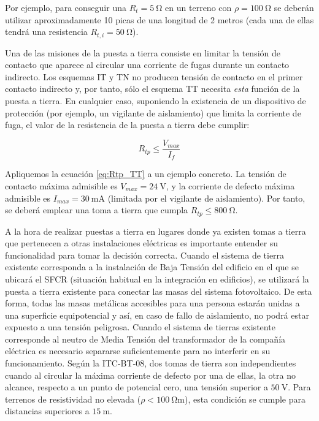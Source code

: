 Por ejemplo, para conseguir una $R_{t}=\SI{5}{\ohm}$ en un terreno
con $\rho=\SI{100}{\ohm}$ se deberán utilizar aproximadamente 10
picas de una longitud de 2 metros (cada una de ellas tendrá una resistencia
$R_{t,i}=\SI{50}{\ohm}$). 

Una de las misiones de la puesta a tierra consiste en limitar la
tensión de contacto que aparece al circular una corriente de fugas
durante un contacto indirecto. Los esquemas IT y TN no producen tensión
de contacto en el primer contacto indirecto y, por tanto, sólo el
esquema TT necesita \emph{esta} función de la puesta a tierra. En
cualquier caso, suponiendo la existencia de un dispositivo de protección
(por ejemplo, un vigilante de aislamiento) que limita la corriente
de fuga, el valor de la resistencia de la puesta a tierra debe cumplir:

\begin{equation}
R_{tp}\leq\frac{V_{max}}{I_{f}}\label{eq:Rtp_TT}\end{equation}


Apliquemos la ecuación \ref{eq:Rtp_TT} a un ejemplo concreto. La
tensión de contacto máxima admisible es $V_{max}=\SI{24}{\volt}$, y la
corriente de defecto máxima admisible es
$I_{max}=\SI{30}{\milli\ampere}$ (limitada por el vigilante de aislamiento). Por tanto, se deberá emplear una toma a tierra que cumpla $R_{tp}\leq\SI{800}{\ohm}$.

A la hora de realizar puestas a tierra en lugares donde ya existen
tomas a tierra que pertenecen a otras instalaciones eléctricas es
importante entender su funcionalidad para tomar la decisión correcta.
Cuando el sistema de tierra existente corresponda a la instalación de
Baja Tensión del edificio en el que se ubicará el SFCR (situación
habitual en la integración en edificios), se utilizará la puesta a
tierra existente para conectar las masas del sistema fotovoltaico.  De
esta forma, todas las masas metálicas accesibles para una persona
estarán unidas a una superficie equipotencial y así, en caso de fallo
de aislamiento, no podrá estar expuesto a una tensión
peligrosa. Cuando el sistema de tierras existente corresponde al
neutro de Media Tensión del transformador de la compañía eléctrica es
necesario separarse suficientemente para no interferir en su
funcionamiento. Según la ITC-BT-08, dos tomas de tierra son
independientes cuando al circular la máxima corriente de defecto por
una de ellas, la otra no alcance, respecto a un punto de potencial
cero, una tensión superior a $\SI{50}{\volt}$. Para terrenos de
resistividad no elevada ($\rho<\SI{100}{\ohm\meter}$), esta condición
se cumple para distancias superiores a $\SI{15}{\meter}$.


